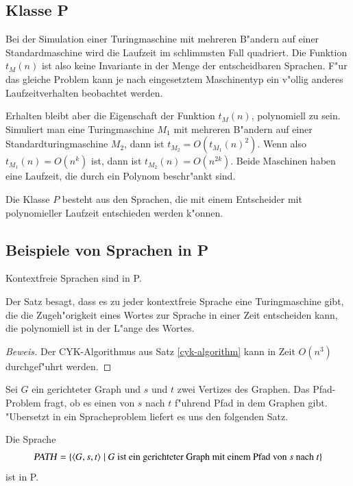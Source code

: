 \subsection{Klasse P}
Bei der Simulation einer Turingmaschine mit mehreren B"andern
auf einer Standardmaschine wird die Laufzeit im schlimmsten
Fall quadriert. Die Funktion $t_M(n)$ ist also keine Invariante
in der Menge der entscheidbaren Sprachen. F"ur das gleiche Problem kann
je nach eingesetztem Maschinentyp ein v"ollig anderes Laufzeitverhalten
beobachtet werden. 

Erhalten bleibt aber die Eigenschaft der Funktion $t_M(n)$, 
polynomiell zu sein. Simuliert man eine Turingmaschine $M_1$ mit
mehreren B"andern auf einer Standardturingmaschine $M_2$,
dann ist $t_{M_2}=O(t_{M_1}(n)^2)$.
Wenn also $t_{M_1}(n)=O(n^k)$ ist, dann ist $t_{M_2}(n)=O(n^{2k}).$
Beide Maschinen haben eine Laufzeit, die durch ein Polynom beschr"ankt
sind.

\begin{definition}
Die Klasse $P$ besteht aus den Sprachen, die mit einem Entscheider
mit polynomieller Laufzeit entschieden werden k"onnen.
\end{definition}

\subsection{Beispiele von Sprachen in P}
\begin{satz}
Kontextfreie Sprachen sind in P.
\end{satz}

Der Satz besagt, dass es zu jeder kontextfreie Sprache eine
Turingmaschine gibt, die die Zugeh"origkeit eines Wortes zur
Sprache in einer Zeit entscheiden kann, die polynomiell ist in
der L"ange des Wortes.

\begin{proof}[Beweis]
Der CYK-Algorithmus aus Satz \ref{cyk-algorithm}
kann in Zeit $O(n^3)$ durchgef"uhrt werden.
\end{proof}

Sei $G$ ein gerichteter Graph und $s$ und $t$ zwei Vertizes
des Graphen. Das Pfad-Problem fragt, ob es einen von $s$ nach $t$
f"uhrend Pfad in dem Graphen gibt. "Ubersetzt in ein Spracheproblem
liefert es uns den folgenden Satz.

\begin{satz}
Die Sprache
\[
\text{\textsl{PATH}}
=\{
\langle G,s,t\rangle
\;|\;\text{$G$ ist ein gerichteter Graph mit einem Pfad von $s$ nach $t$}
\}
\]
ist in P.
\end{satz}

